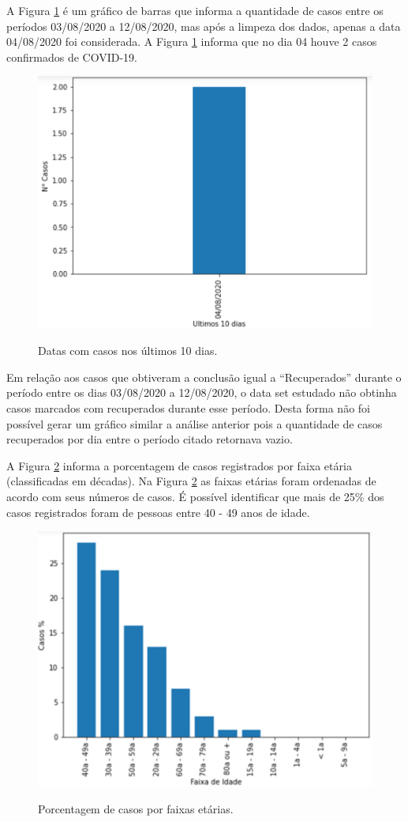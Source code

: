 \documentclass[12pt]{article}
\begin{document}
A Figura \ref{fig:seção_2.2_questão_3} é um gráfico de barras que informa a quantidade de casos entre os períodos 03/08/2020 a 12/08/2020, mas após a limpeza dos dados, apenas a data 04/08/2020 foi considerada. A Figura \ref{fig:seção_2.2_questão_3} informa que no dia 04 houve 2 casos confirmados de COVID-19.

\begin{figure}[!ht]
  \centering
    \includegraphics[width=.5\linewidth]{Figuras/numero_de_casos_nos_ultimos_10_dias.png} \\
  \caption{Datas com casos nos últimos 10 dias.}
  \label{fig:seção_2.2_questão_3}
\end{figure}

Em relação aos casos que obtiveram a conclusão igual a ``Recuperados'' durante o período entre os dias 03/08/2020 a 12/08/2020, o data set estudado não obtinha casos marcados com recuperados durante esse período. Desta forma não foi possível gerar um gráfico similar a análise anterior pois a quantidade de casos recuperados por dia entre o período citado retornava vazio.

A Figura \ref{fig:seção_2.2_questão_5} informa a porcentagem de casos registrados por faixa etária (classificadas em décadas). Na Figura \ref{fig:seção_2.2_questão_5} as faixas etárias foram ordenadas de acordo com seus números de casos. É possível identificar que mais de 25\% dos casos registrados foram de pessoas entre 40 - 49 anos de idade.

\begin{figure}[!ht]
  \centering
    \includegraphics[width=.5\linewidth]{Figuras/casos_por_faixa_etaria.png} \\
  \caption{Porcentagem de casos por faixas etárias.}
  \label{fig:seção_2.2_questão_5}
\end{figure}
\end{document}
